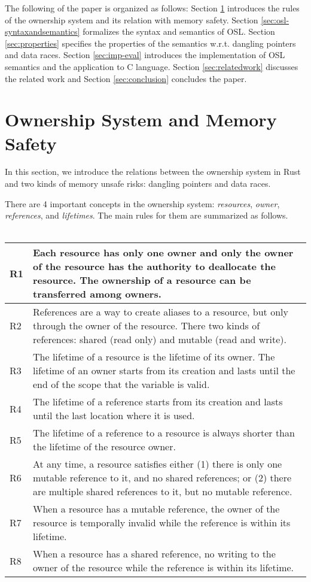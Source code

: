 \documentclass[runningheads]{llncs}
\begin{document}
The following of the paper is organized as follows: Section \ref{sec:ownership} introduces the rules of the ownership system and its relation with memory safety.
 Section \ref{sec:osl-syntaxandsemantics}  formalizes the syntax and semantics of OSL.
 Section \ref{sec:properties} specifies the properties of the semantics w.r.t. dangling pointers and data races.
 Section \ref{sec:imp-eval} introduces the implementation of OSL semantics and the application to C language.
 Section \ref{sec:relatedwork} discusses the related work and Section \ref{sec:conclusion}
 concludes the paper. 
 
 
 
\section{Ownership System and Memory Safety}
\label{sec:ownership}

In this section, we introduce the relations between the ownership system in Rust and two kinds of
memory unsafe risks: dangling pointers and data races.

There are 4 important concepts in the ownership system: \emph{resources}, \emph{owner}, \emph{references}, and \emph{lifetimes}. 
The main rules for them are summarized as follows.\\\\
{\scriptsize
\begin{tabular}{p{1cm}|p{11cm}}
\hline 
R1 &  Each resource has only one owner and only the owner of the resource has the authority to deallocate the resource.
The ownership of a resource can be transferred among owners. \\
\hline
R2 &  References are a way to create aliases to a resource, but only through the owner of the resource.
There two kinds of references: shared (read only) and mutable (read and write).\\
\hline
R3 & The lifetime of a resource is the lifetime of its owner. The lifetime of an owner starts from its creation and lasts until the end of the scope that the variable is valid.\\
\hline
R4 & The lifetime of a reference starts from its creation and lasts until the last location where it is used.\\
\hline
R5 & The lifetime of a reference to a resource is always shorter than the lifetime of the resource owner.\\
\hline
R6 & At any time, a resource satisfies either (1) there is only one mutable reference to it, and no shared references; or (2) 
there are multiple shared references to it, but no mutable reference.\\
\hline
R7 & When a resource has a mutable reference, the owner of the resource is temporally invalid while the reference is within its lifetime.\\
\hline
R8 & When a resource has a shared reference, no writing to the owner of the resource while the reference is within its lifetime.\\
\hline
\end{tabular}}
\end{document}
